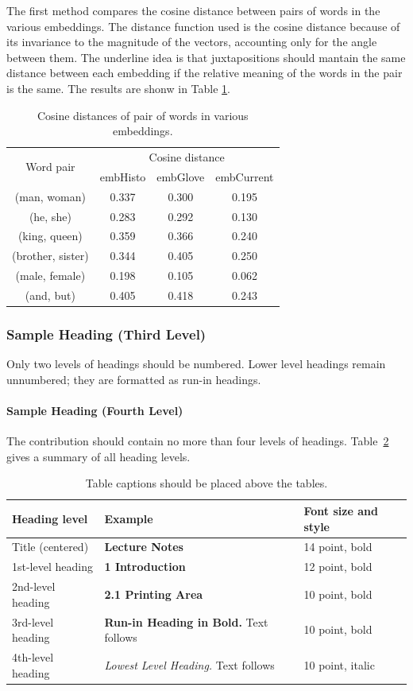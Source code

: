 \documentclass[runningheads]{llncs}
\begin{document}
The first method compares the cosine distance between pairs of words in the various embeddings. The distance function used is the cosine distance because of its invariance to the magnitude of the vectors, accounting only for the angle between them. The underline idea is that juxtapositions should mantain the same distance between each embedding if the relative meaning of the words in the pair is the same. The results are shonw in Table \ref{tab:justappox}.

\begin{table}
\centering
\caption{Cosine distances of pair of words in various embeddings.}
\label{tab:justappox}
\begin{tabular}{|c|c|c|c|}
\hline
\multirow{2}{*}{Word pair} & \multicolumn{3}{|c|}{Cosine distance}\\\cline{2-4}
&embHisto&embGlove&embCurrent\\
\hline
(man, woman) &  0.337 & 0.300 & 0.195\\
(he, she) & 0.283 & 0.292 & 0.130\\
(king, queen) & 0.359 & 0.366 & 0.240\\
(brother, sister) & 0.344 & 0.405 & 0.250\\
(male, female) & 0.198 & 0.105 & 0.062\\
(and, but) & 0.405 & 0.418 & 0.243\\
\hline
\end{tabular}
\end{table}




\subsubsection{Sample Heading (Third Level)} Only two levels of
headings should be numbered. Lower level headings remain unnumbered;
they are formatted as run-in headings.

\paragraph{Sample Heading (Fourth Level)}
The contribution should contain no more than four levels of
headings. Table~\ref{tab1} gives a summary of all heading levels.

\begin{table}
\caption{Table captions should be placed above the
tables.}\label{tab1}
\begin{tabular}{|l|l|l|}
\hline
Heading level &  Example & Font size and style\\
\hline
Title (centered) &  {\Large\bfseries Lecture Notes} & 14 point, bold\\
1st-level heading &  {\large\bfseries 1 Introduction} & 12 point, bold\\
2nd-level heading & {\bfseries 2.1 Printing Area} & 10 point, bold\\
3rd-level heading & {\bfseries Run-in Heading in Bold.} Text follows & 10 point, bold\\
4th-level heading & {\itshape Lowest Level Heading.} Text follows & 10 point, italic\\
\hline
\end{tabular}
\end{table}
\end{document}
